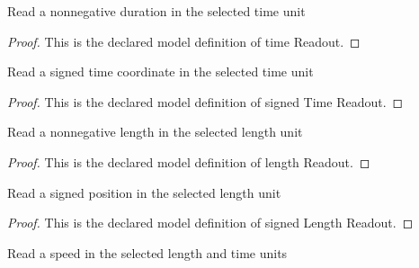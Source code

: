 \begin{definition}
  \label{def:physics:phyx-mini-0309:phyxminiproblems-problemphyxmini0309-timereadout}
  Read a nonnegative duration in the selected time unit
\end{definition}
\begin{proof}
  This is the declared model definition of time Readout.
\end{proof}
\begin{definition}
  \label{def:physics:phyx-mini-0309:phyxminiproblems-problemphyxmini0309-signedtimereadout}
  Read a signed time coordinate in the selected time unit
\end{definition}
\begin{proof}
  This is the declared model definition of signed Time Readout.
\end{proof}
\begin{definition}
  \label{def:physics:phyx-mini-0309:phyxminiproblems-problemphyxmini0309-lengthreadout}
  Read a nonnegative length in the selected length unit
\end{definition}
\begin{proof}
  This is the declared model definition of length Readout.
\end{proof}
\begin{definition}
  \label{def:physics:phyx-mini-0309:phyxminiproblems-problemphyxmini0309-signedlengthreadout}
  Read a signed position in the selected length unit
\end{definition}
\begin{proof}
  This is the declared model definition of signed Length Readout.
\end{proof}
\begin{definition}
  \label{def:physics:phyx-mini-0309:phyxminiproblems-problemphyxmini0309-speedreadout}
  Read a speed in the selected length and time units
\end{definition}
